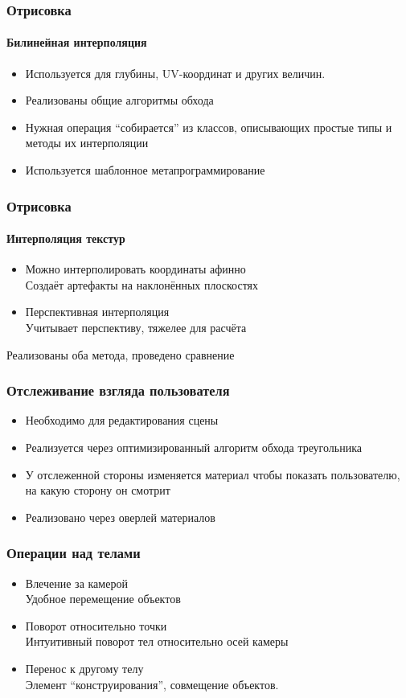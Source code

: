 \documentclass{beamer}
\begin{document}
\begin{frame}
\frametitle{Отрисовка}
\framesubtitle{Билинейная интерполяция}

\begin{itemize}
\item Используется для глубины, UV-координат и других величин.
\item Реализованы общие алгоритмы обхода
\item Нужная операция ``собирается'' из классов, описывающих простые типы и методы их интерполяции
\item Используется шаблонное метапрограммирование
\end{itemize}
\end{frame}

\begin{frame}
\frametitle{Отрисовка}
\framesubtitle{Интерполяция текстур}

\begin{itemize}
\item Можно интерполировать координаты афинно \\
Создаёт артефакты на наклонённых плоскостях
\item Перспективная интерполяция \\
Учитывает перспективу, тяжелее для расчёта
\end{itemize}
Реализованы оба метода, проведено сравнение
\end{frame}

\begin{frame}
\frametitle{Отслеживание взгляда пользователя}

\begin{itemize}
\item Необходимо для редактирования сцены
\item Реализуется через оптимизированный алгоритм обхода треугольника
\item У отслеженной стороны изменяется материал чтобы показать пользователю, на какую сторону он смотрит
\item Реализовано через оверлей материалов
\end{itemize}
\end{frame}

\begin{frame}
\frametitle{Операции над телами}

\begin{itemize}
\item Влечение за камерой \\
Удобное перемещение объектов
\item Поворот относительно точки \\
Интуитивный поворот тел относительно осей камеры
\item Перенос к другому телу \\
Элемент ``конструирования'', совмещение объектов.
\end{itemize}
\end{frame}
\end{document}
